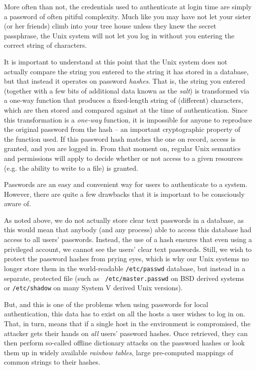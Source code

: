 More often than not, the credentials used to
authenticate at login time are simply a password of
often pitiful complexity.  Much like you may have not
let your sister (or her friends) climb into your tree
house unless they knew the secret passphrase, the Unix
system will not let you log in without you entering
the correct string of characters.

It is important to understand at this point that the
Unix system does not actually compare the string you
entered to the string it has stored in a database, but
that instead it operates on password {\em hashes}.
That is, the string you entered (together with a few
bits of additional data known as the {\em salt}) is
transformed via a one-way function that produces a
fixed-length string of (different) characters, which
are then stored and compared against at the time of
authentication.  Since this transformation is a {\em
one-way} function, it is impossible for anyone to
reproduce the original password from the hash -- an
important cryptographic property of the function used.
If this password hash matches the one on record,
access is granted, and you are logged in.  From that
moment on, regular Unix semantics and permissions will
apply to decide whether or not access to a given
resources (e.g. the ability to write to a file) is
granted.

Passwords are an easy and convenient way for users to
authenticate to a system.  However, there are quite a
few drawbacks that it is important to be consciously
aware of.

As noted above, we do not actually store clear text
passwords in a database, as this would mean that
anybody (and any process) able to access this database
had access to all users' passwords.  Instead, the
use of a hash ensures that even using a privileged
account, we cannot see the users' clear text
passwords.  Still, we wish to protect the password
hashes from prying eyes, which is why our Unix
systems no longer store them in the world-readable
{\tt /etc/passwd} database, but instead in a separate,
protected file (such as {\tt
/etc/master.passwd} on
BSD derived systems or {\tt /etc/shadow} on many System V derived Unix
versions).

But, and this is one of the problems when using
passwords for local authentication, this data has to
exist on all the hosts a user wishes to log in on.
That, in turn, means that if a single host in the
environment is compromised, the attacker gets their
hands on {\em all} users' password hashes.  Once
retrieved, they can then perform so-called offline
dictionary attacks on the password hashes or look them
up in widely available {\em rainbow
tables}, large pre-computed
mappings of common strings to their hashes.

